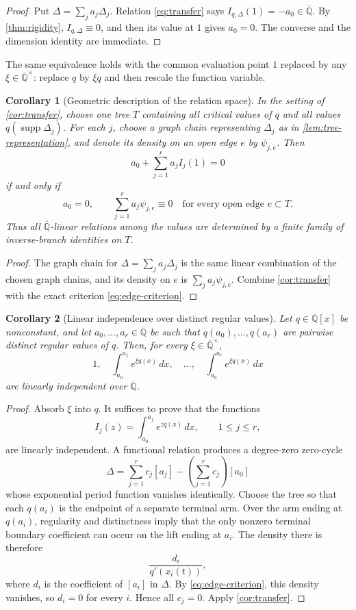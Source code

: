 \documentclass[11pt]{article}
\numberwithin{equation}{section}
\newtheorem{corollary}[corollary]{Corollary}
\theoremstyle{definition}
\theoremstyle{remark}
\newcommand{\Qbar}{\overline{\mathbb Q}}
\newcommand{\supp}{\operatorname{supp}}
\begin{document}
\begin{proof}
Put $\Delta=\sum_j a_j\Delta_j$.  Relation \eqref{eq:transfer} says
$I_{q,\Delta}(1)=-a_0\in\Qbar$.  By \cref{thm:rigidity},
$I_{q,\Delta}\equiv0$, and then its value at $1$ gives $a_0=0$.  The
converse and the dimension identity are immediate.
\end{proof}

The same equivalence holds with the common evaluation point $1$ replaced by
any $\xi\in\Qbar^\times$: replace $q$ by $\xi q$ and then rescale the
function variable.

\begin{corollary}[Geometric description of the relation space]
\label{cor:geometric-relations}
In the setting of \cref{cor:transfer}, choose one tree $T$ containing all
critical values of $q$ and all values
$q(\supp\Delta_j)$.  For each $j$, choose a graph chain representing
$\Delta_j$ as in \cref{lem:tree-representation}, and denote its density on
an open edge $e$ by $\psi_{j,e}$.  Then
\[
  a_0+\sum_{j=1}^r a_jI_j(1)=0
\]
if and only if
\[
  a_0=0,
  \qquad
  \sum_{j=1}^r a_j\psi_{j,e}\equiv0
  \quad\text{for every open edge }e\subset T.
\]
Thus all $\Qbar$-linear relations among the values are determined by a
finite family of inverse-branch identities on $T$.
\end{corollary}

\begin{proof}
The graph chain for $\Delta=\sum_j a_j\Delta_j$ is the same linear
combination of the chosen graph chains, and its density on $e$ is
$\sum_j a_j\psi_{j,e}$.  Combine \cref{cor:transfer} with the exact
criterion \eqref{eq:edge-criterion}.
\end{proof}

\begin{corollary}[Linear independence over distinct regular values]
\label{cor:regular}
Let $q\in\Qbar[x]$ be nonconstant, and let $a_0,\ldots,a_r\in\Qbar$ be
such that $q(a_0),\ldots,q(a_r)$ are pairwise distinct regular values of
$q$.  Then, for every $\xi\in\Qbar^\times$,
\[
  1,\quad
  \int_{a_0}^{a_1}e^{\xi q(x)}\,dx,\quad\ldots,\quad
  \int_{a_0}^{a_r}e^{\xi q(x)}\,dx
\]
are linearly independent over $\Qbar$.
\end{corollary}

\begin{proof}
Absorb $\xi$ into $q$.  It suffices to prove that the functions
\[
  I_j(z)=\int_{a_0}^{a_j}e^{zq(x)}\,dx,
  \qquad 1\le j\le r,
\]
are linearly independent.  A functional relation produces a degree-zero
zero-cycle
\[
  \Delta=\sum_{j=1}^r c_j[a_j]
  -\left(\sum_{j=1}^r c_j\right)[a_0]
\]
whose exponential period function vanishes identically.  Choose the tree
so that each $q(a_i)$ is the endpoint of a separate terminal arm.  Over the
arm ending at $q(a_i)$, regularity and distinctness imply that the only
nonzero terminal boundary coefficient can occur on the lift ending at
$a_i$.  The density there is therefore
\[
  \frac{d_i}{q'(x_i(t))},
\]
where $d_i$ is the coefficient of $[a_i]$ in $\Delta$.  By
\eqref{eq:edge-criterion}, this density vanishes, so $d_i=0$ for every
$i$.  Hence all $c_j=0$.  Apply \cref{cor:transfer}.
\end{proof}
\end{document}
